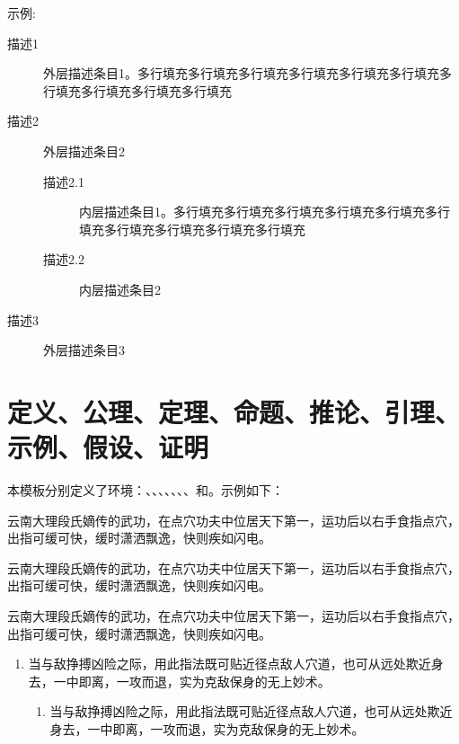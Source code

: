 \documentclass[doctor, vlined]{DissertUESTC}
\begin{document}
	\null

	示例:

	\begin{description}
		\item[描述1] 外层描述条目1。多行填充多行填充多行填充多行填充多行填充多行填充多行填充多行填充多行填充多行填充
		\item[描述2] 外层描述条目2
		\begin{description}
			\item[描述2.1] 内层描述条目1。多行填充多行填充多行填充多行填充多行填充多行填充多行填充多行填充多行填充多行填充
			\item[描述2.2] 内层描述条目2
		\end{description}
		\item[描述3] 外层描述条目3
	\end{description}
	
	\clearpage
	\section{定义、公理、定理、命题、推论、引理、示例、假设、证明}
	
	本模板分别定义了环境：、、、、、、、和。示例如下：
	

	\begin{definition}[具体名称]
		云南大理段氏嫡传的武功，在点穴功夫中位居天下第一，运功后以右手食指点穴，出指可缓可快，缓时潇洒飘逸，快则疾如闪电。
	\end{definition}

	\begin{axiom}[具体名称]
		云南大理段氏嫡传的武功，在点穴功夫中位居天下第一，运功后以右手食指点穴，出指可缓可快，缓时潇洒飘逸，快则疾如闪电。
	\end{axiom}
	
	\begin{theorem}[具体名称]
		云南大理段氏嫡传的武功，在点穴功夫中位居天下第一，运功后以右手食指点穴，出指可缓可快，缓时潇洒飘逸，快则疾如闪电。

		\begin{enumerate}
			\item 当与敌挣搏凶险之际，用此指法既可贴近径点敌人穴道，也可从远处欺近身去，一中即离，一攻而退，实为克敌保身的无上妙术。
			\begin{enumerate}
				\item 当与敌挣搏凶险之际，用此指法既可贴近径点敌人穴道，也可从远处欺近身去，一中即离，一攻而退，实为克敌保身的无上妙术。
			\end{enumerate}
		\end{enumerate}
	\end{theorem}
	
\end{document}
